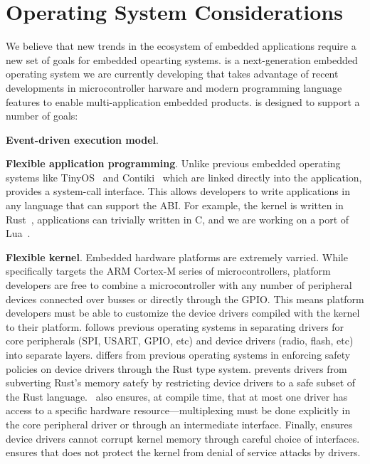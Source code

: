 \section{Operating System Considerations}

We believe that new trends in the ecosystem of embedded applications require a
new set of goals for embedded opearting systems. \name is a next-generation
embedded operating system we are currently developing that takes advantage of
recent developments in microcontroller harware and modern programming language
features to enable multi-application embedded products. \name is designed to
support a number of goals:

{\bf Event-driven execution model}.

{\bf Flexible application programming}. Unlike previous embedded operating
systems like TinyOS~\cite{tinyos} and Contiki~\cite{contiki} which are linked
directly into the application, \name provides a system-call interface. This
allows developers to write applications in any language that can support the
ABI. For example, the \name kernel is written in Rust~\cite{rust}, applications
can trivially written in C, and we are working on a port of Lua~\cite{lua}.

{\bf Flexible kernel}. Embedded hardware platforms are extremely varried. While
\name specifically targets the ARM Cortex-M series of microcontrollers, platform
developers are free to combine a microcontroller with any number of peripheral
devices connected over busses or directly through the GPIO. This means platform
developers must be able to customize the device drivers compiled with the kernel
to their platform. \name follows previous operating systems in separating
drivers for core peripherals (SPI, USART, GPIO, etc) and device drivers (radio,
flash, etc) into separate layers. \name differs from previous operating systems
in enforcing safety policies on device drivers through the Rust type system.
\name prevents drivers from subverting Rust's memory satefy by restricting
device drivers to a safe subset of the Rust language.~ \name
also ensures, at compile time, that at most one driver has access to a specific
hardware resource---multiplexing must be done explicitly in the core peripheral
driver or through an intermediate interface. Finally, \name ensures device
drivers cannot corrupt kernel memory through careful choice of interfaces. \name
ensures that \name does not protect the kernel from denial of service attacks by
drivers.

